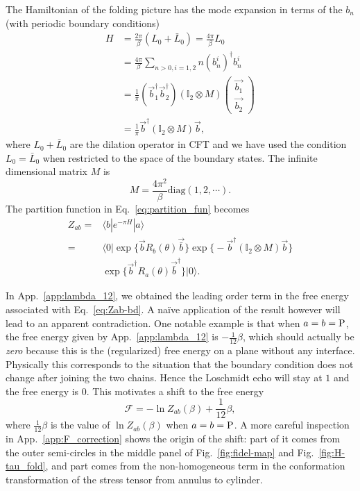 The Hamiltonian of the folding picture has the mode expansion in terms of the $b_n$ (with periodic boundary conditions)
\begin{equation}
\begin{aligned}
  H &= \frac{2\pi}{\beta} (L_0 + \bar{L}_0) =  \frac{4\pi}{\beta}  L_0 \\
  &= \frac{4\pi}{\beta}\sum_{n > 0, i=1,2 }  n (b^i_n)^{\dagger} b^i_n \\
  &=  \frac{1}{\pi}(\vec{b}_1^{\dagger} \vec{b}_2^{\dagger} ) (\mathbb{I}_2  \otimes M)
\begin{pmatrix}
  \vec{{b}_1}\\
  \vec{{b}_2}
\end{pmatrix}\\
 &= \frac{1}{\pi} \vec{b}^{\dagger}  (\mathbb{I}_2  \otimes M)  \vec{b} ,
\end{aligned}
\end{equation}
where $L_0+ \bar{L}_0$ are the dilation operator in CFT and we have used the condition $L_0 = \bar{L}_0$ when restricted to the space of the boundary states. The infinite dimensional matrix $M$ is
\begin{equation}
M =  \frac{4\pi^2}{\beta} \text{diag}( 1, 2, \cdots ).
\end{equation}
The partition function in Eq.~\eqref{eq:partition_fun} becomes
\begin{equation}
\label{eq:Zab-bd}
\begin{aligned}
Z_{ab} =& \langle b | e^{-\pi H} | a \rangle \\
=& \langle 0 | \exp\Big\{  \vec{b} R_b( \theta )    \vec{\bar{b}} \Big\}  \exp\Big\{ -\vec{b}^{\dagger}  (\mathbb{I}_2  \otimes M)  \vec{b} \Big\} \\
&\exp\Big\{  \vec{b}^{\dagger} R_a( \theta )    \vec{\bar{b}}^{\dagger} \Big\} | 0\rangle .
\end{aligned}
\end{equation}

In App.~\ref{app:lambda_12}, we obtained the leading order term in the free energy associated with Eq.~\eqref{eq:Zab-bd}. A na\"ive application of the result however will lead to an apparent contradiction. One notable example is that when $a = b  = {\rm P}$, the free energy given by App.~\ref{app:lambda_12} is $- \frac{1}{12}\beta$, which should actually be {\it zero} because this is the (regularized) free energy on a plane without any interface. Physically this corresponds to the situation that the boundary condition does not change after joining the two chains. Hence the Loschmidt echo will stay at $1$ and the free energy is $0$. This motivates a shift to the free energy
\begin{equation}
\mathcal{F} = - \ln Z_{ab} ( \beta ) + \frac{1}{12} \beta ,
\end{equation}
where $\frac{1}{12}\beta$ is the value of $ \ln Z_{ab} ( \beta )$ when $a = b = {\rm P}$. A more careful inspection in App.~\ref{app:F_correction} shows the origin of the shift: part of it comes from the outer semi-circles in the middle panel of Fig.~\ref{fig:fidel-map} and Fig.~\ref{fig:H-tau_fold}, and part comes from the non-homogeneous term in the conformation transformation of the stress tensor from annulus to cylinder. 

